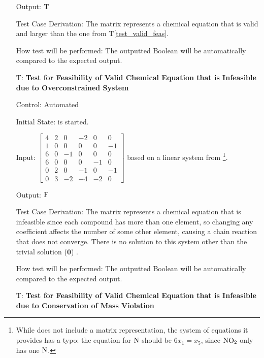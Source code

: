 \documentclass[12pt, titlepage]{article}
\newcounter{testnum} %
\newcommand{\testref}[1]{T\ref{#1}}
\begin{document}
\begin{enumerate}
    Output: $\textsc{T}$

    Test Case Derivation: The matrix represents a chemical equation that is
    valid and larger than the one from \testref{test_valid_feas}.

    How test will be performed: The outputted Boolean will be automatically
    compared to the expected output.

  \item[T\refstepcounter{testnum}\thetestnum \label{test_over_valid_inf}:]
    \textbf{Test for Feasibility of Valid Chemical Equation that is Infeasible
      due to Overconstrained System}

    Control: Automated

    Initial State: \progname{} is started.

    Input:
    $\begin{bmatrix}
        4 & 2 & 0  & -2 & 0  & 0  \\
        1 & 0 & 0  & 0  & 0  & -1 \\
        6 & 0 & -1 & 0  & 0  & 0  \\
        6 & 0 & 0  & 0  & -1 & 0  \\
        0 & 2 & 0  & -1 & 0  & -1 \\
        0 & 3 & -2 & -4 & -2 & 0
      \end{bmatrix}$ based on a linear system from
    \cite{hamid_balancing_2019}\footnote{While \cite{hamid_balancing_2019}
      does not include a matrix representation, the
      system of equations it provides has a typo: the equation for $\ce{N}$
      should be $6x_1 = x_5$, since $\ce{NO2}$ only has one $\ce{N}$.}.

    Output: $\textsc{F}$

    Test Case Derivation: The matrix represents a chemical equation that is
    infeasible since
    each compound has more than one element, so changing any coefficient
    affects the number of some other element, causing a chain reaction that
    does not converge. There is no solution to this system other than the
    trivial solution ($\mathbf{0}$) \cite{hamid_balancing_2019}.

    How test will be performed: The outputted Boolean will be automatically
    compared to the expected output.

  \item[T\refstepcounter{testnum}\thetestnum \label{test_cons_mass_valid_inf}:]
    \textbf{Test for Feasibility of  Valid Chemical Equation that is Infeasible
      due to Conservation of Mass Violation}


\end{enumerate}
\end{document}
